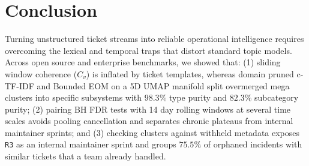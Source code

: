 \documentclass[sigconf,nonacm,pbalance]{acmart}
\begin{document}
\section{Conclusion}
Turning unstructured ticket streams into reliable operational intelligence requires overcoming the lexical and temporal traps that distort standard topic models. Across open source and enterprise benchmarks, we showed that: (1) sliding window coherence ($C_v$) is inflated by ticket templates, whereas domain pruned c-TF-IDF and Bounded EOM on a 5D UMAP manifold split overmerged mega clusters into specific subsystems with $98.3\%$ type purity and $82.3\%$ subcategory purity; (2) pairing BH FDR tests with 14 day rolling windows at several time scales avoids pooling cancellation and separates chronic plateaus from internal maintainer sprints; and (3) checking clusters against withheld metadata exposes \texttt{R3} as an internal maintainer sprint and groups $75.5\%$ of orphaned incidents with similar tickets that a team already handled.



\end{document}
